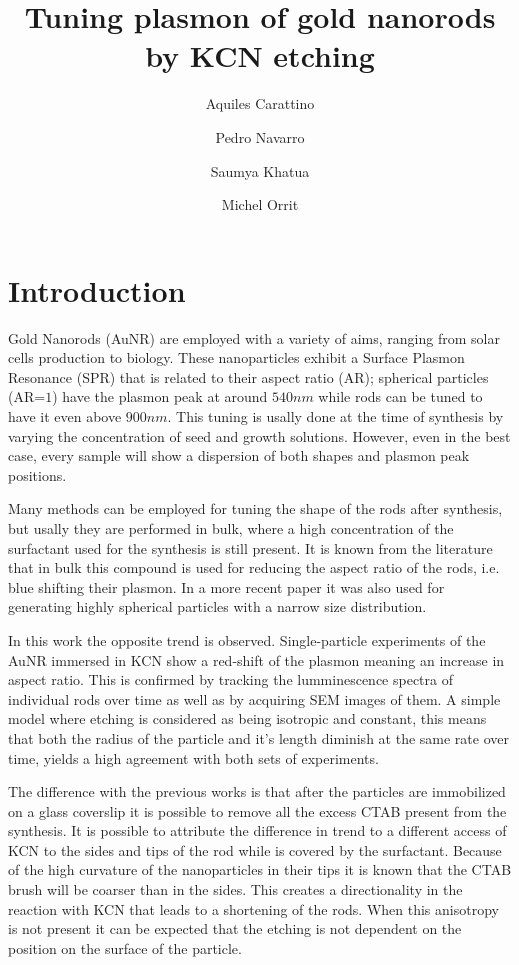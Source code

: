 \documentclass[twocolumn]{article}
\title{Tuning plasmon of gold nanorods by KCN etching}
\author{Aquiles Carattino \and Pedro Navarro \and Saumya Khatua \and Michel
Orrit}
\begin{document}
\maketitle
{}

\section{Introduction}
Gold Nanorods (AuNR) are employed with a variety of aims, ranging from solar
cells production to biology. These nanoparticles exhibit a Surface Plasmon
Resonance (SPR) that is related to their aspect ratio (AR); spherical particles
(AR=$1$) have the plasmon peak at around $540nm$ while rods can be tuned to
have it even above $900nm$. This tuning is usally done at the time of synthesis
by varying the concentration of seed and growth solutions. However, even in the
best case, every sample will show a dispersion of both shapes and plasmon peak
positions. 

Many methods can be employed for tuning the shape of the rods after synthesis,
but usally they are performed in bulk, where a high concentration of the
surfactant used for the synthesis is still present. It is known from the
literature that in bulk this compound is used for reducing the aspect ratio of
the rods, i.e. blue shifting their plasmon. In a more recent paper it was also
used for generating highly spherical particles with a narrow size distribution. 

In this work the opposite trend is observed. Single-particle experiments of the
AuNR immersed in KCN show a red-shift of the plasmon meaning an increase in
aspect ratio. This is confirmed by tracking the lumminescence spectra of
individual rods over time as well as by acquiring SEM images of them. A simple
model where etching is considered as being isotropic and constant, this means 
that both the radius of the particle and it's length diminish at the same rate
over time, yields a high agreement with both sets of experiments. 

The difference with the previous works is that after the particles are
immobilized on a glass coverslip it is possible to remove all the excess CTAB
present from the synthesis. It is possible to attribute the difference in trend
to a different access of KCN to the sides and tips of the rod while is covered
by the surfactant. Because of the high curvature of the nanoparticles in their
tips it is known that the CTAB brush will be coarser than in the sides. This
creates a directionality in the reaction with KCN that leads to a shortening of
the rods. When this anisotropy is not present it can be expected that the
etching is not dependent on the position on the surface of the particle.
\end{document}

